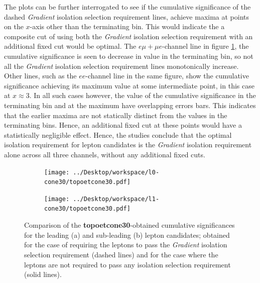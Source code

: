 The plots can be further interrogated to see if the cumulative significance of the dashed \textit{Gradient} isolation selection requirement lines, achieve maxima at points on the $x$-axis other than the terminating bin. This would indicate the a composite cut of using both the \textit{Gradient} isolation selection requirement with an additional fixed cut would be optimal. The $e\mu + \mu e$-channel line in figure \ref{leading_topoetcone}, the cumulative significance is seen to decrease in value in the terminating bin, so not all the \textit{Gradient} isolation selection requirement lines monotonically increase. Other lines, such as the $ee$-channel line in the same figure, show the cumulative significance achieving its maximum value at some intermediate point, in this case at $x \approx 3$. In all such cases however, the value of the cumulative significance in the terminating bin and at the maximum have overlapping errors bars. This indicates that the earlier maxima are not statically distinct from the values in the terminating bins. Hence, an additional fixed cut at these points would have a statistically negligible effect. Hence, the studies conclude that the optimal isolation requirement for lepton candidates is the \textit{Gradient} isolation requirement alone across all three channels, without any additional fixed cuts.
\begin{figure}
\centering
\begin{subfigure}{.85\textwidth}
  \centering
  \texttt{[image: ../Desktop/workspace/l0-cone30/topoetcone30.pdf]}
  \caption{}
  \label{leading_topoetcone}
\end{subfigure}
\begin{subfigure}{.85\textwidth}
  \centering
  \texttt{[image: ../Desktop/workspace/l1-cone30/topoetcone30.pdf]}
  \caption{}
  \label{subleading_topoetcone}
\end{subfigure}
\caption{Comparison of the \textbf{topoetcone30}-obtained cumulative significances for the leading (a) and sub-leading (b) lepton candidates; obtained for the case of requiring the leptons to pass the \textit{Gradient} isolation selection requirement (dashed lines) and for the case where the leptons are not required to pass any isolation selection requirement (solid lines).}
\label{comp_topoetcone}
\end{figure}
